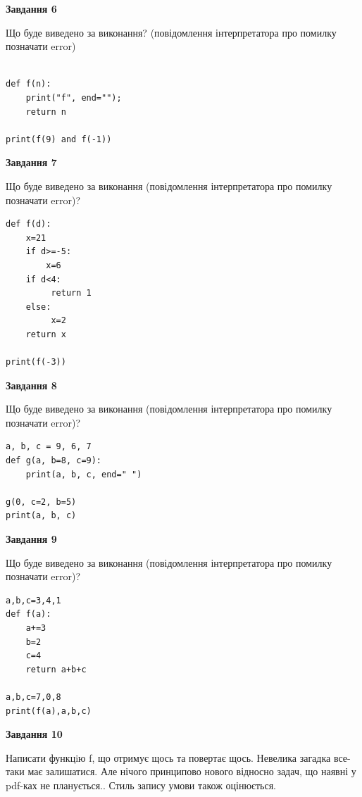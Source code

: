\documentclass[12pt, ukrainian]{article}
\begin{document}
{\begin {large}
{\begin {center}\textbf{Завдання 6}\end {center}}

Що буде виведено за виконання? (повідомлення інтерпретатора про помилку позначати error)\par
\begin{verbatim}

def f(n):
    print("f", end="");
    return n

print(f(9) and f(-1))
\end{verbatim}

{\begin {center}\textbf{Завдання 7}\end {center}}

Що буде виведено за виконання (повідомлення інтерпретатора про помилку позначати error)?\par
\begin{verbatim}
def f(d):
    x=21
    if d>=-5: 
        x=6
    if d<4:
         return 1
    else:
         x=2
    return x

print(f(-3))
\end{verbatim}

{\begin {center}\textbf{Завдання 8}\end {center}}

Що буде виведено за виконання (повідомлення інтерпретатора про помилку позначати error)?\par
\begin{verbatim}
a, b, c = 9, 6, 7
def g(a, b=8, c=9):
    print(a, b, c, end=" ")

g(0, c=2, b=5)
print(a, b, c)
\end{verbatim}

{\begin {center}\textbf{Завдання 9}\end {center}}

Що буде виведено за виконання (повідомлення інтерпретатора про помилку позначати error)?\par
\begin{verbatim}
a,b,c=3,4,1
def f(a):
    a+=3
    b=2
    c=4
    return a+b+c

a,b,c=7,0,8
print(f(a),a,b,c)
\end{verbatim}

{\begin {center}\textbf{Завдання 10}\end {center}}


Написати функцiю f, що отримує щось та повертає щось. Невелика загадка все-таки має залишатися. Але нічого принципово нового відносно задач, що наявні у pdf-ках не планується.. Стиль запису умови також оцінюється.\par
\end {large}}
\newpage
\end{document}
